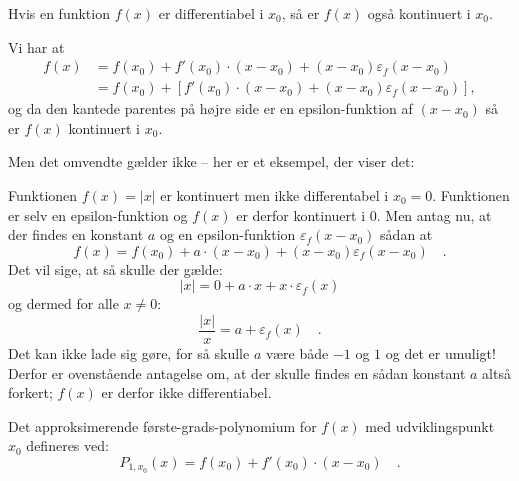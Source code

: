 \begin{theorem}
Hvis en funktion $f(x)$ er differentiabel i $x_{0}$, så er $f(x)$ også kontinuert i $x_{0}$.
\end{theorem}
\begin{bevis}
Vi har at
\begin{equation}
\begin{aligned}
f(x)&= f(x_{0}) + f'(x_{0})\cdot(x-x_{0}) + (x-x_{0})\varepsilon_{f}(x-x_{0})\\
 &= f(x_{0}) + \left[ f'(x_{0})\cdot(x-x_{0}) + (x-x_{0})\varepsilon_{f}(x-x_{0})\right],
\end{aligned}
\end{equation}
og da den kantede parentes på højre side er en epsilon-funktion af $(x - x_{0})$ så er $f(x)$ kontinuert i $x_{0}$.
\end{bevis}

Men det omvendte gælder ikke -- her er et eksempel, der viser det:
\begin{example}
Funktionen $f(x) = |x|$ er kontinuert men ikke differentabel i $x_{0} = 0$. Funktionen er selv en epsilon-funktion og $f(x)$ er derfor
kontinuert i $0$. Men antag nu, at der findes en konstant $a$ og en epsilon-funktion $\varepsilon_{f}(x-x_{0})$ sådan at
\begin{equation}
f(x) = f(x_{0}) + a\cdot(x-x_{0}) + (x-x_{0})\varepsilon_{f}(x-x_{0}) \quad .
\end{equation}
Det vil sige, at så skulle der gælde:
\begin{equation}
|x|  = 0 + a\cdot x + x \cdot \varepsilon_{f}(x)
\end{equation}
og dermed for alle $x \neq 0$:
\begin{equation}
\frac{|x|}{x}  = a + \varepsilon_{f}(x) \quad .
\end{equation}
Det kan ikke lade sig gøre, for så skulle $a$ være både $-1$ og $1$ og det er umuligt! Derfor er ovenstående antagelse om, at der skulle findes
en sådan konstant $a$ altså forkert; $f(x)$ er derfor ikke differentiabel.
\end{example}


\begin{definition}
Det approksimerende første-grads-polynomium for $f(x)$ med udviklingspunkt $x_{0}$ defineres ved:
\begin{equation}
P_{1, x_{0}}(x) = f(x_{0}) + f'(x_{0})\cdot(x - x_{0}) \quad .
\end{equation}

\end{definition}


